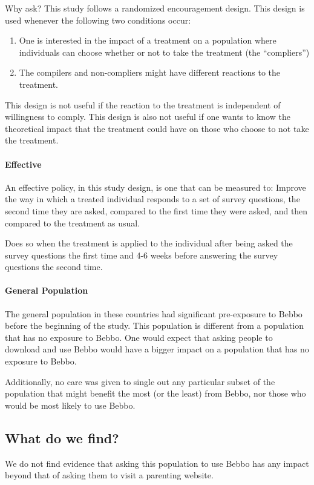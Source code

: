 \documentclass{article}
\begin{document}
Why ask? This study follows a randomized encouragement design. This design is used whenever the following two conditions occur:

\begin{enumerate}
\item One is interested in the impact of a treatment on a population where individuals can choose whether or not to take the treatment (the “compliers”)
\item The compilers and non-compliers might have different reactions to the treatment.
\end{enumerate}

This design is not useful if the reaction to the treatment is independent of willingness to comply. This design is also not useful if one wants to know the theoretical impact that the treatment could have on those who choose to not take the treatment.

\paragraph*{Effective}
An effective policy, in this study design, is one that can be measured to:
Improve the way in which a treated individual responds to a set of survey questions, the second time they are asked, compared to the first time they were asked, and then compared to the treatment as usual.

Does so when the treatment is applied to the individual after being asked the survey questions the first time and 4-6 weeks before answering the survey questions the second time.

\paragraph*{General Population}
The general population in these countries had significant pre-exposure to Bebbo before the beginning of the study. This population is different from a population that has no exposure to Bebbo. One would expect that asking people to download and use Bebbo would have a bigger impact on a population that has no exposure to Bebbo.

Additionally, no care was given to single out any particular subset of the population that might benefit the most (or the least) from Bebbo, nor those who would be most likely to use Bebbo.

\subsection*{What do we find?}
We do not find evidence that asking this population to use Bebbo has any impact beyond that of asking them to visit a parenting website.
\end{document}
